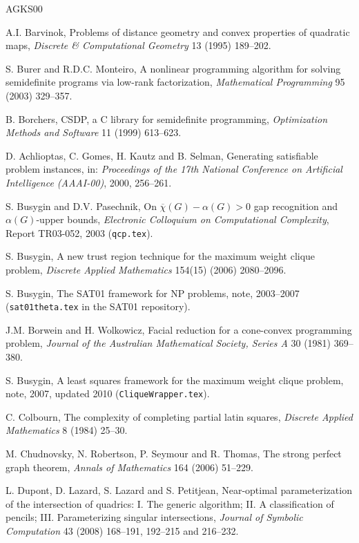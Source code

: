\documentclass[11pt]{article}
\theoremstyle{definition}
\theoremstyle{remark}
\begin{document}
\begin{thebibliography}{AGKS00}

  A.I. Barvinok,
  Problems of distance geometry and convex properties of quadratic maps,
  {\em Discrete \& Computational Geometry\/} 13 (1995) 189--202.

  S. Burer and R.D.C. Monteiro,
  A nonlinear programming algorithm for solving semidefinite programs via
  low-rank factorization,
  {\em Mathematical Programming\/} 95 (2003) 329--357.

  B. Borchers,
  CSDP, a C library for semidefinite programming,
  {\em Optimization Methods and Software\/} 11 (1999) 613--623.

  D. Achlioptas, C. Gomes, H. Kautz and B. Selman,
  Generating satisfiable problem instances,
  in: {\em Proceedings of the 17th National Conference on Artificial
  Intelligence (AAAI-00)\/}, 2000, 256--261.

  S. Busygin and D.V. Pasechnik,
  On $\overline{\chi}(G)-\alpha(G)>0$ gap recognition and
  $\alpha(G)$-upper bounds,
  {\em Electronic Colloquium on Computational Complexity\/}, Report
  TR03-052, 2003 (\texttt{qcp.tex}).

  S. Busygin,
  A new trust region technique for the maximum weight clique problem,
  {\em Discrete Applied Mathematics\/} 154(15) (2006) 2080--2096.

  S. Busygin,
  The SAT01 framework for NP problems,
  note, 2003--2007 (\texttt{sat01theta.tex} in the SAT01 repository).

  J.M. Borwein and H. Wolkowicz,
  Facial reduction for a cone-convex programming problem,
  {\em Journal of the Australian Mathematical Society, Series A\/} 30 (1981)
  369--380.

  S. Busygin,
  A least squares framework for the maximum weight clique problem,
  note, 2007, updated 2010 (\texttt{CliqueWrapper.tex}).

  C. Colbourn,
  The complexity of completing partial latin squares,
  {\em Discrete Applied Mathematics\/} 8 (1984) 25--30.

  M. Chudnovsky, N. Robertson, P. Seymour and R. Thomas,
  The strong perfect graph theorem,
  {\em Annals of Mathematics\/} 164 (2006) 51--229.

  L. Dupont, D. Lazard, S. Lazard and S. Petitjean,
  Near-optimal parameterization of the intersection of quadrics:
  I. The generic algorithm; II. A classification of pencils;
  III. Parameterizing singular intersections,
  {\em Journal of Symbolic Computation\/} 43 (2008) 168--191, 192--215 and
  216--232.


\end{thebibliography}
\end{document}
